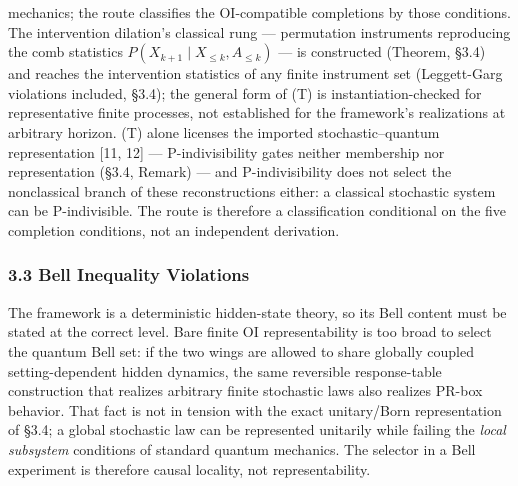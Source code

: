 \documentclass[
]{article}
\begin{document}
mechanics; the route classifies the OI-compatible completions by those
conditions. The intervention dilation's classical rung --- permutation
instruments reproducing the comb statistics
\(P(X_{k+1} \mid X_{\leq k}, A_{\leq k})\) --- is constructed (Theorem,
§3.4) and reaches the intervention statistics of any finite instrument
set (Leggett-Garg violations included, §3.4); the general form of (T) is
instantiation-checked for representative finite processes, not
established for the framework's realizations at arbitrary horizon. (T)
alone licenses the imported stochastic--quantum representation {[}11,
12{]} --- P-indivisibility gates neither membership nor representation
(§3.4, Remark) --- and P-indivisibility does not select the nonclassical
branch of these reconstructions either: a classical stochastic system
can be P-indivisible. The route is therefore a classification
conditional on the five completion conditions, not an independent
derivation.

\hypertarget{bell-inequality-violations}{%
\subsubsection{3.3 Bell Inequality
Violations}\label{bell-inequality-violations}}

The framework is a deterministic hidden-state theory, so its Bell
content must be stated at the correct level. Bare finite OI
representability is too broad to select the quantum Bell set: if the two
wings are allowed to share globally coupled setting-dependent hidden
dynamics, the same reversible response-table construction that realizes
arbitrary finite stochastic laws also realizes PR-box behavior. That
fact is not in tension with the exact unitary/Born representation of
§3.4; a global stochastic law can be represented unitarily while failing
the \emph{local subsystem} conditions of standard quantum mechanics. The
selector in a Bell experiment is therefore causal locality, not
representability.
\end{document}
